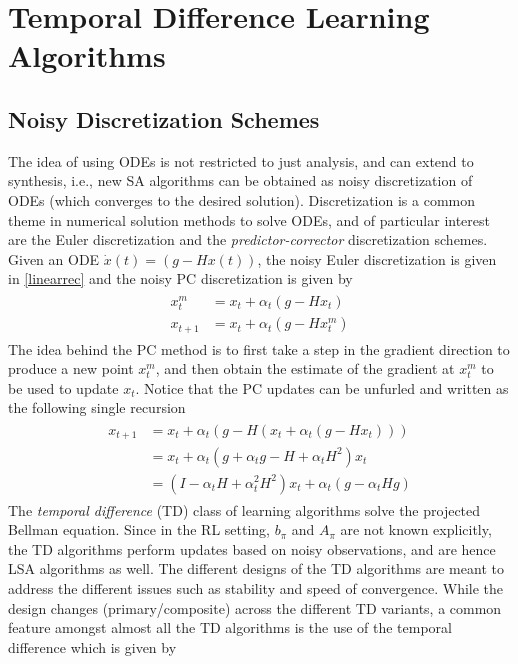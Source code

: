 \section{Temporal Difference Learning Algorithms}
\subsection{Noisy Discretization Schemes}
The idea of using ODEs is not restricted to just analysis, and can extend to synthesis, i.e., new SA algorithms can be obtained as noisy discretization of ODEs (which converges to the desired solution). Discretization is a common theme in numerical solution methods to solve ODEs, and of particular interest are the Euler discretization and the \emph{predictor-corrector} discretization schemes. Given an ODE $\dot{x}(t)=(g-Hx(t))$, the noisy Euler discretization is given in \eqref{linearrec} and the noisy PC discretization is given by
\begin{align}\label{PC}
\begin{split}
x^m_{t}&=x_t+\alpha_t(g-Hx_t)\\
x_{t+1}&=x_t+\alpha_t(g-Hx^m_t)
\end{split}
\end{align}
The idea behind the PC method is to first take a step in the gradient direction to produce a new point $x^m_t$, and then obtain the estimate of the gradient at $x^m_t$ to be used to update $x_t$. Notice that the PC updates can be unfurled and written as the following single recursion
\begin{align*}
\begin{split}
x_{t+1}&=x_t+\alpha_t(g-H(x_t+\alpha_t(g-Hx_t)))\\
&=x_t+\alpha_t(g+\alpha_t g- H +\alpha_t H^2)x_t \\
&= (I-\alpha_t H+\alpha_t^2 H^2)x_t+\alpha_t(g-\alpha_t H g)
\end{split}
\end{align*}
The \emph{temporal difference} (TD) class of learning algorithms solve the projected Bellman equation. Since in the RL setting, $b_\pi$ and $A_\pi$ are not known explicitly, the TD algorithms perform updates based on noisy observations, and are hence LSA algorithms as well. The different designs of the TD algorithms are meant to address the different issues such as stability and speed of convergence.
While the design changes (primary/composite) across the different TD variants, a common feature amongst almost all the TD algorithms is the use of the temporal difference which is given by
